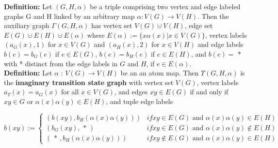 \documentclass[a4,12pt]{article}
\theoremstyle{plain}
\numberwithin{theorem}{section}
\begin{document}
\textbf{Definition:} Let $(G, H, \alpha)$ be a triple comprising two vertex and edge
labeled graphs G and H linked by an arbitrary map $\alpha : V(G) \rightarrow V(H)$.
Then the auxiliary graph $\Gamma(G, H, \alpha)$ has vertex set $V(G) \cupdot V(H)$,
 edge set $E(G) \cupdot E(H) \cupdot E(\alpha)$ where $E(\alpha) := \{x \alpha(x)|x \in V (G)\}$,
 vertex labels $(a_G(x), 1)$ for $x \in V(G)$ and $(a_H(x), 2)$ for $x \in V(H)$ and edge labels
 $b(e) = b_G(e)$ if $e \in E(G)$, $b(e) = b_H(e)$ if $e \in E(H)$, and $b(e) =$ * with *
distinct from the edge labels in $G$ and $H$, if $e \in E(\alpha)$.\\

\textbf{Definition:} Let $\alpha$ : $V(G) \rightarrow V(H)$ be an an atom map. Then $\Upsilon(G, H, \alpha)$
is the \textbf{imaginary transition state graph} with vertex set $V(G)$, vertex labels $a_\Upsilon (x) = a_G (x)$ for all
$x \in V(G)$, and edges $xy \in E(G)$ if and only if $xy \in G$ or $\alpha(x)\alpha(y) \in E(H)$,
and tuple edge labels

$$
b(xy) := \begin{cases}
(b (xy), b_H(\alpha(x)\alpha(y))) & if xy \in E(G) \text{ and }\alpha(x)\alpha(y) \in E(H) \\
(b_G(xy), \text{ * } ) & if xy \in E(G) \text{ and } \alpha(x)\alpha(y) \notin E(H) \\
(\text{ * } , b_H(\alpha(x)\alpha(y)))  & if xy \notin E(G) \text{ and } \alpha(x)\alpha(y) \in E(H)
\end{cases}
$$
\end{document}

